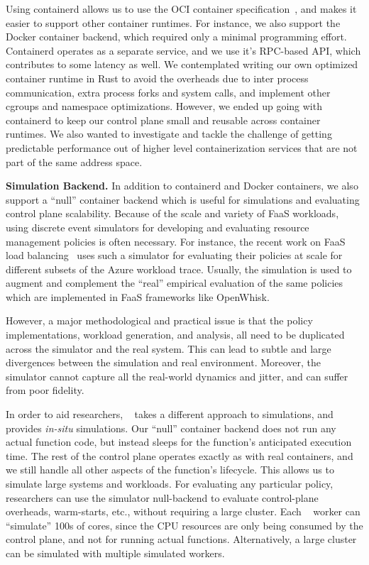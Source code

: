 Using containerd allows us to use the OCI container specification~\cite{oci}, and makes it easier to support other container runtimes.
For instance, we also support the Docker container backend, which required only a minimal programming effort.
Containerd operates as a separate service, and we use it's RPC-based API, which contributes to some latency as well.
We contemplated writing our own optimized container runtime in Rust to avoid the overheads due to inter process communication, extra process forks and system calls, and implement other cgroups and namespace optimizations. 
However, we ended up going with containerd to keep our control plane small and reusable across container runtimes.
We also wanted to investigate and tackle the challenge of getting predictable performance out of higher level containerization services that are not part of the same address space. 


\noindent \textbf{Simulation Backend.}
In addition to containerd and Docker containers, we also support a ``null'' container backend which is useful for simulations and evaluating control plane scalability.
%
Because of the scale and variety of FaaS workloads, using discrete event simulators for developing and evaluating resource management policies is often necessary.
%
For instance, the recent work on FaaS load balancing~\cite{faaslb-hpdc22} uses such a simulator for evaluating their policies at scale for different subsets of the Azure workload trace.
Usually, the simulation is used to augment and complement the ``real'' empirical evaluation of the same policies which are implemented in FaaS frameworks like OpenWhisk. 

However, a major methodological and practical issue is that the policy implementations, workload generation, and analysis, all need to be duplicated across the simulator and the real system.
This can lead to subtle and large divergences between the simulation and real environment. 
Moreover, the simulator cannot capture all the real-world dynamics and jitter, and can suffer from poor fidelity.

In order to aid researchers, \sysname~ takes a different approach to simulations, and provides \emph{in-situ} simulations. 
Our ``null'' container backend does not run any actual function code, but instead sleeps for the function's anticipated execution time.
The rest of the control plane operates exactly as with real containers, and we still handle all other aspects of the function's lifecycle.
%
This allows us to simulate large systems and workloads. 
For evaluating any particular policy, researchers can use the simulator null-backend to evaluate control-plane overheads, warm-starts, etc., without requiring a large cluster.
Each \sysname~ worker can ``simulate'' 100s of cores, since the CPU resources are only being consumed by the control plane, and not for running actual functions.
Alternatively, a large cluster can be simulated with multiple simulated workers. 

